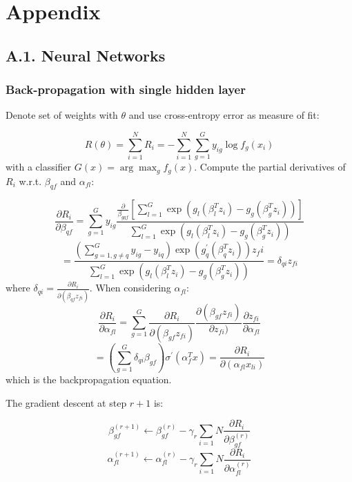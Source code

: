 \documentclass[12pt,]{article}
\begin{document}
\clearpage

\hypertarget{appendix}{%
\section{Appendix}\label{appendix}}

\hypertarget{a.1.-neural-networks}{%
\subsection{A.1. Neural Networks}\label{a.1.-neural-networks}}

\hypertarget{back-propagation-with-single-hidden-layer}{%
\subsubsection{Back-propagation with single hidden
layer}\label{back-propagation-with-single-hidden-layer}}

Denote set of weights with \(\theta\) and use cross-entropy error as
measure of fit:

\[R(\theta)=\sum_{i=1}^{N}R_i =-\sum_{i=1}^{N}\sum_{g=1}^{G}y_{ig}\log{f_g(x_i)}\]
with a classifier \(G(x)=\arg\max_{g}f_g(x)\). Compute the partial
derivatives of \(R_i\) w.r.t. \(\beta_{qf}\) and \(\alpha_{fl}\):

\[\frac{\partial R_i}{\partial \beta_{qf}}=\sum_{g=1}^{G}y_{ig}\frac{\frac{\partial}{\beta_{gqf}}[\sum_{l=1}^{G}\exp(g_l(\beta_{l}^{T}z_i)-g_g(\beta_{g}^{T}z_i))]}{\sum_{l=1}^{G}\exp(g_l(\beta_{l}^{T}z_i)-g_g(\beta_{g}^{T}z_i))}\]
\[=\frac{(\sum_{g=1,g\neq q}^{G}y_{ig}-y_{iq})\exp(g_{q}^{'}(\beta_q^Tz_i))z_fi}{\sum_{l=1}^{G}\exp(g_l(\beta_{l}^{T}z_i)-g_g(\beta_{g}^{T}z_i))}=\delta_{qi}z_{fi}\]
where \(\delta_{qi}=\frac{\partial R_i}{\partial (\beta_{qf} z_{fi})}\).
When considering \(\alpha_{fl}\):
\[\frac{\partial R_i}{\partial \alpha_{fl}}=\sum_{g=1}^{G}\frac{\partial R_i}{\partial (\beta_{gf}z_{fi})}\frac{\partial (\beta_{gf}z_{fi})}{\partial z_{fi})}\frac{\partial z_{fi}}{\partial \alpha_{fl}}\]
\[= (\sum_{g=1}^{G}\delta_{qi}\beta_{gf})\sigma^{'}(\alpha_{f}^{T}x)=\frac{\partial R_i}{\partial (\alpha_{fl}x_{li})}\]
which is the backpropagation equation.

The gradient descent at step \(r+1\) is:

\[\beta_{gf}^{(r+1)}\leftarrow\beta_{gf}^{(r)}-\gamma_r\sum_{i=1}{N}\frac{\partial R_i}{\partial \beta_{gf}^{(r)}}\]
\[\alpha_{fl}^{(r+1)}\leftarrow\alpha_{fl}^{(r)}-\gamma_r\sum_{i=1}{N}\frac{\partial R_i}{\partial \alpha_{fl}^{(r)}}\]
\end{document}
